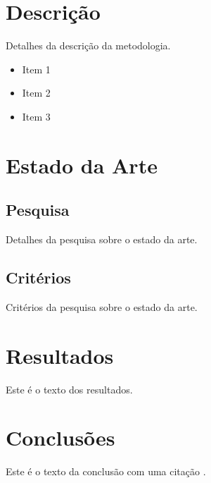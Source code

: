 \documentclass[12pt,a4paper,final]{article}
\begin{document}
    \section{Descrição}\label{sec:descricao}
    Detalhes da descrição da metodologia.

    \begin{itemize}
        \item Item 1
        \item Item 2
        \item Item 3
    \end{itemize}


    \section{Estado da Arte}\label{sec:estado-da-arte}

    \subsection{Pesquisa}\label{subsec:pesquisa}
    Detalhes da pesquisa sobre o estado da arte.

    \subsection{Critérios}\label{subsec:criterios}
    Critérios da pesquisa sobre o estado da arte.


    \section{Resultados}\label{sec:resultados}
    Este é o texto dos resultados.

    \begin{table}[H]
        \centering
        \caption{Tabela Exemplo}
        \label{tab:my-table}
    \end{table}


    \section{Conclusões}\label{sec:conclusoes}
    Este é o texto da conclusão com uma citação \cite{su15010857}.

    \newpage
    \printbibliography
\end{document}
